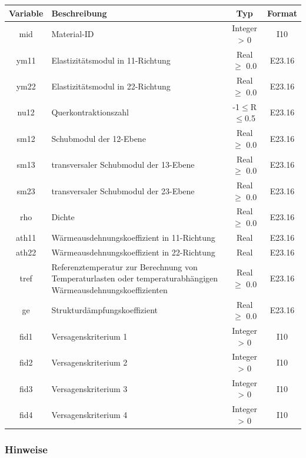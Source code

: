 \documentclass[11pt,titlepage,listof=totoc,bibliography=totoc,twoside]{scrreprt}
\begin{document}
{{\begin{tabularx}{\textwidth}{cXcc}
\toprule
Variable& Beschreibung														& Typ			& Format\\
\midrule
mid	& Material-ID														& Integer > 0		& I10	\\
ym11	& Elastizitätsmodul	in 11-Richtung											& Real $\ge$ 0.0	& E23.16\\
ym22	& Elastizitätsmodul	in 22-Richtung											& Real $\ge$ 0.0	& E23.16\\
nu12	& Querkontraktionszahl													& -1$\le$R$\le$0.5	& E23.16\\
sm12	& Schubmodul der 12-Ebene												& Real $\ge$ 0.0	& E23.16\\
sm13	& transversaler Schubmodul der 13-Ebene											& Real $\ge$ 0.0	& E23.16\\
sm23	& transversaler Schubmodul der 23-Ebene											& Real $\ge$ 0.0	& E23.16\\
rho	& Dichte														& Real $\ge$ 0.0	& E23.16\\
ath11	& Wärmeausdehnungskoeffizient in 11-Richtung										& Real			& E23.16\\
ath22	& Wärmeausdehnungskoeffizient in 22-Richtung										& Real			& E23.16\\
tref	& Referenztemperatur zur Berechnung von Temperaturlasten oder temperaturabhängigen Wärmeausdehnungskoeffizienten	& Real $\ge$ 0.0	& E23.16\\
ge	& Strukturdämpfungskoeffizient												& Real $\ge$ 0.0	& E23.16\\
fid1	& Versagenskriterium 1													& Integer > 0		& I10	\\
fid2	& Versagenskriterium 2													& Integer > 0		& I10	\\
fid3	& Versagenskriterium 3													& Integer > 0		& I10	\\
fid4	& Versagenskriterium 4													& Integer > 0		& I10	\\
\bottomrule
\end{tabularx}

\subsubsection{Hinweise}

}}
\end{document}
